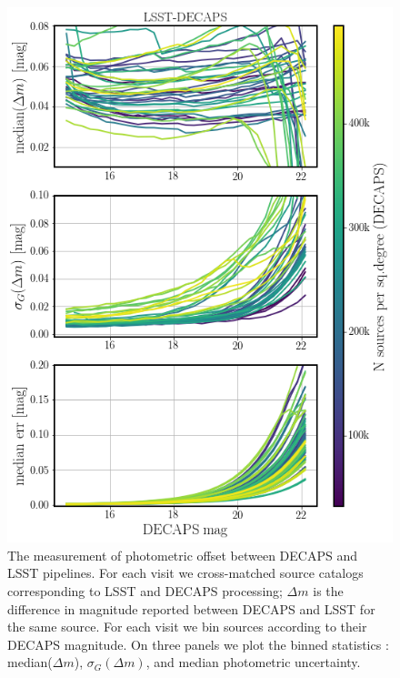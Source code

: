 \documentclass[DM,lsstdraft,toc,usenatbib]{lsstdoc}
\begin{document}
\begin{figure}
\begin{centering}
\includegraphics[width=0.7\columnwidth]{figs/decaps_lsst_rms_plot.png}
\caption{The measurement of photometric offset between DECAPS and LSST pipelines. For each visit we cross-matched source catalogs corresponding to LSST and DECAPS processing; $\Delta m$ is the difference in magnitude reported between DECAPS and LSST for the same source. For each visit we bin sources according to their DECAPS magnitude. On three panels we plot the binned statistics : median($\Delta m$),  $\sigma_{G}(\Delta m)$, and median photometric uncertainty.}
\label{fig:lsst_decaps_dmag}
\end{centering}
\end{figure} 
\end{document}
